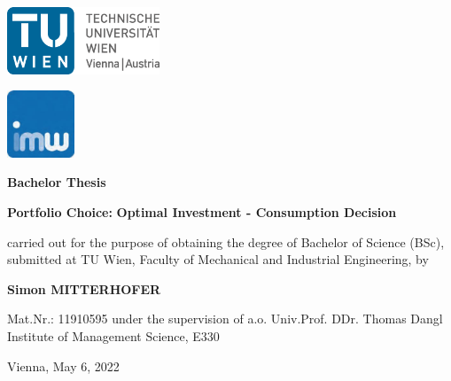 \begin{titlepage}
    \begin{minipage}{0.6\textwidth}
        \includegraphics[height=2cm]{files/TULogo.png}
    \end{minipage}\hfill
    \begin{minipage}{0.4\textwidth}
        \hfill \includegraphics[height=2cm]{files/logo-imw.jpg}
    \end{minipage}
    
    \begin{center}  
        \vskip 2cm
        {\LARGE \textbf{Bachelor Thesis}}
    
    
    
        \vskip 2cm
    
        {\huge \bfseries Portfolio Choice:}
        \vskip 5mm
        {\LARGE \bfseries Optimal Investment - Consumption Decision}
        \vskip 2cm
    
    

        {\large carried out for the purpose of obtaining the degree of}
        \vskip 3mm
        {\large Bachelor of Science (BSc),}
        \vskip 3mm
        {\large submitted at TU Wien, Faculty of Mechanical and Industrial Engineering, by}
   
        \vskip 2cm
        {\LARGE\bfseries Simon MITTERHOFER}
        
        \vskip 0.5cm
        {\large Mat.Nr.: 11910595}
        \vskip 2cm
        {\large under the supervision of}
        \vskip 5mm
        {\Large a.o. Univ.Prof. DDr. Thomas Dangl}
        \vskip 5mm
        {\Large Institute of Management Science, E330}
    
  \end{center}
  
  \vfill
  
  \begin{center}
       {\Large Vienna, May 6, 2022}
  \end{center}

  \vspace*{-15mm}
\end{titlepage}